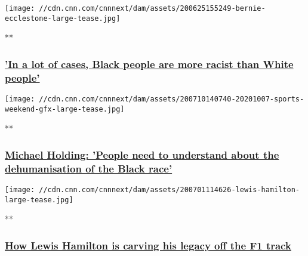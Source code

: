 \href{/videos/sports/2020/06/26/bernie-ecclestone-racism-sport-society-lewis-hamilton-formula-one-spt-intl.cnn}{}

\texttt{[image: //cdn.cnn.com/cnnnext/dam/assets/200625155249-bernie-ecclestone-large-tease.jpg]}

**

\hypertarget{in-a-lot-of-cases-black-people-are-more-racist-than-white-people}{%
\subsubsection{\texorpdfstring{\href{/videos/sports/2020/06/26/bernie-ecclestone-racism-sport-society-lewis-hamilton-formula-one-spt-intl.cnn}{'In
a lot of cases, Black people are more racist than White
people'}}{'In a lot of cases, Black people are more racist than White people'}}\label{in-a-lot-of-cases-black-people-are-more-racist-than-white-people}}

\href{/videos/sports/2020/07/10/michael-holding-west-indian-cricketer-sky-sports-race-spt-intl.cnn}{}

\texttt{[image: //cdn.cnn.com/cnnnext/dam/assets/200710140740-20201007-sports-weekend-gfx-large-tease.jpg]}

**

\hypertarget{michael-holding-people-need-to-understand-about-the-dehumanisation-of-the-black-race}{%
\subsubsection{\texorpdfstring{\href{/videos/sports/2020/07/10/michael-holding-west-indian-cricketer-sky-sports-race-spt-intl.cnn}{Michael
Holding: 'People need to understand about the dehumanisation of the
Black
race'}}{Michael Holding: 'People need to understand about the dehumanisation of the Black race'}}\label{michael-holding-people-need-to-understand-about-the-dehumanisation-of-the-black-race}}

\href{/videos/sports/2020/07/01/lewis-hamilton-legacy-off-the-track-equality-racism-formula-one-spt-intl.cnn}{}

\texttt{[image: //cdn.cnn.com/cnnnext/dam/assets/200701114626-lewis-hamilton-large-tease.jpg]}

**

\hypertarget{how-lewis-hamilton-is-carving-his-legacy-off-the-f1-track}{%
\subsubsection{\texorpdfstring{\href{/videos/sports/2020/07/01/lewis-hamilton-legacy-off-the-track-equality-racism-formula-one-spt-intl.cnn}{How
Lewis Hamilton is carving his legacy off the F1
track}}{How Lewis Hamilton is carving his legacy off the F1 track}}\label{how-lewis-hamilton-is-carving-his-legacy-off-the-f1-track}}

